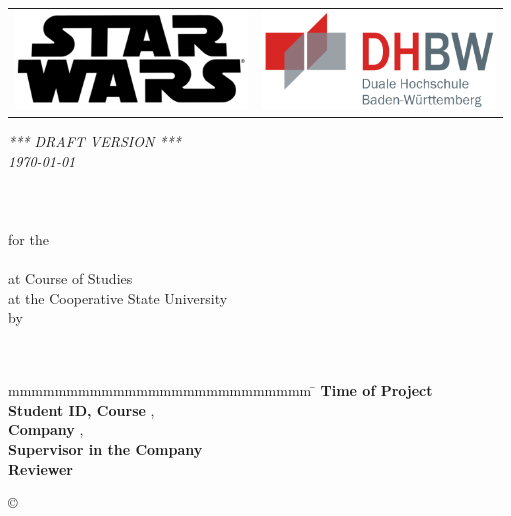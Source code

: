 \begin{titlepage}
	\begin{longtable}{p{} p{}}
		{\includegraphics[height=2.6cm]{images/logo.png}} &
		{\includegraphics[height=2.6cm]{images/dhbw.png}}
	\end{longtable}
	\enlargethispage{20mm}
	\begin{center}
		{\textit{ *** DRAFT VERSION *** \\{\tiny \today \\}}}
		{\vspace*{12mm}}
		{\LARGE\textbf{ \titel }}\\
		\vspace*{4mm}   {\large \untertitel}\\
		\vspace*{12mm}	{\large\textbf{ \arbeit}}\\
		\vspace*{8mm}	for the\\
		\vspace*{3mm} 	{\textbf{ \abschluss}}\\
		\vspace*{12mm}	at Course of Studies \studiengang\\
		\vspace*{3mm} 	at the Cooperative State University \dhbw\\
		\vspace*{12mm}	by\\
		\vspace*{3mm} 	{\large\textbf{ \autor}}\\
		\vspace*{12mm}	\datumAbgabe\\
	\end{center}
	\vfill
	\begin{spacing}{1.2}
		\begin{tabbing}
			mmmmmmmmmmmmmmmmmmmmmmmmmm     \= \kill
			\textbf{Time of Project}  \>  \zeitraum\\
			\textbf{Student ID, Course}  \>  \matrikelnr, \kurs\\
			\textbf{Company}      \>  \firma, \small{\textit{\firmenort}}\\
			\textbf{Supervisor in the Company}              \>  \betreuer\\
			\textbf{Reviewer}             \>  \gutachter
		\end{tabbing}
	\end{spacing}
	\begin{flushright}
		\copyright{} \jahr
	\end{flushright}
\end{titlepage}
